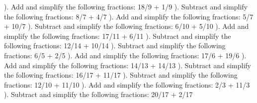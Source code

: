 \documentclass{article}%
\begin{document}
). Add and simplify the following fractions: 18/9 + 1/9%
\newline%
\newline%
). Subtract and simplify the following fractions: 8/7 + 4/7%
\newline%
\newline%
). Add and simplify the following fractions: 5/7 + 10/7%
\newline%
\newline%
). Subtract and simplify the following fractions: 6/10 + 5/10%
\newline%
\newline%
). Add and simplify the following fractions: 17/11 + 6/11%
\newline%
\newline%
). Subtract and simplify the following fractions: 12/14 + 10/14%
\newline%
\newline%
). Subtract and simplify the following fractions: 6/5 + 2/5%
\newline%
\newline%
). Add and simplify the following fractions: 17/6 + 19/6%
\newline%
\newline%
). Add and simplify the following fractions: 14/13 + 14/13%
\newline%
\newline%
). Subtract and simplify the following fractions: 16/17 + 11/17%
\newline%
\newline%
). Subtract and simplify the following fractions: 12/10 + 11/10%
\newline%
\newline%
). Add and simplify the following fractions: 2/3 + 11/3%
\newline%
\newline%
). Subtract and simplify the following fractions: 20/17 + 2/17%
\end{document}
